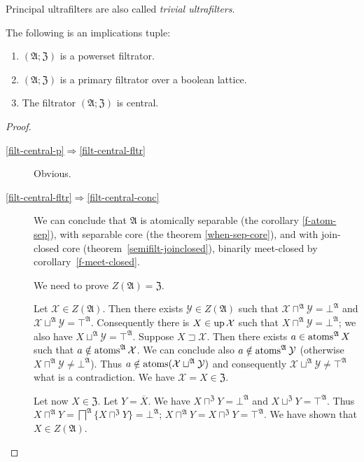 \begin{defn}
Principal ultrafilters are also called
\emph{trivial ultrafilters}.\end{defn}
\begin{thm}
\label{pow-filt-central}The following is an implications tuple:
\begin{enumerate}
\item \label{filt-central-p}$(\mathfrak{A};\mathfrak{Z})$ is a powerset
filtrator.
\item \label{filt-central-fltr}$(\mathfrak{A};\mathfrak{Z})$ is a primary
filtrator over a boolean lattice.
\item \label{filt-central-conc}The filtrator $(\mathfrak{A};\mathfrak{Z})$
is central.
\end{enumerate}
\end{thm}
\begin{proof}
~
\begin{description}
\item [{\ref{filt-central-p}$\Rightarrow$\ref{filt-central-fltr}}] Obvious.
\item [{\ref{filt-central-fltr}$\Rightarrow$\ref{filt-central-conc}}] We
can conclude that $\mathfrak{A}$ is atomically separable (the corollary
\ref{f-atom-sep}), with separable core (the theorem \ref{when-sep-core}),
and with join-closed core (theorem~\ref{semifilt-joinclosed}),
binarily meet-closed by corollary~\ref{f-meet-closed}.


We need to prove $Z(\mathfrak{A})=\mathfrak{Z}$.


Let $\mathcal{X}\in Z(\mathfrak{A})$. Then there exists $\mathcal{Y}\in Z(\mathfrak{A})$
such that $\mathcal{X}\sqcap^{\mathfrak{A}}\mathcal{Y}=\bot^{\mathfrak{A}}$
and $\mathcal{X}\sqcup^{\mathfrak{A}}\mathcal{Y}=\top^{\mathfrak{A}}$.
Consequently there is $X\in\operatorname{up}\mathcal{X}$ such that $X\sqcap^{\mathfrak{A}}\mathcal{Y}=\bot^{\mathfrak{A}}$;
we also have $X\sqcup^{\mathfrak{A}}\mathcal{Y}=\top^{\mathfrak{A}}$.
Suppose $X\sqsupset\mathcal{X}$. Then there exists $a\in\operatorname{atoms}^{\mathfrak{A}}X$
such that $a\notin\operatorname{atoms}^{\mathfrak{A}}\mathcal{X}$. We can conclude
also $a\notin\operatorname{atoms}^{\mathfrak{A}}\mathcal{Y}$ (otherwise $X\sqcap^{\mathfrak{A}}\mathcal{Y}\ne\bot^{\mathfrak{A}}$).
Thus $a\notin\operatorname{atoms}(\mathcal{X}\sqcup^{\mathfrak{A}}\mathcal{Y})$
and consequently $\mathcal{X}\sqcup^{\mathfrak{A}}\mathcal{Y}\ne\top^{\mathfrak{A}}$
what is a contradiction. We have $\mathcal{X}=X\in\mathfrak{Z}$.


Let now $X\in\mathfrak{Z}$. Let $Y=\overline{X}$. We have $X\sqcap^{\mathfrak{Z}}Y=\bot^{\mathfrak{A}}$
and $X\sqcup^{\mathfrak{Z}}Y=\top^{\mathfrak{A}}$. Thus $X\sqcap^{\mathfrak{A}}Y=\bigsqcap^{\mathfrak{A}}\{X\sqcap^{\mathfrak{Z}}Y\}=\bot^{\mathfrak{A}}$;
$X\sqcap^{\mathfrak{A}}Y=X\sqcap^{\mathfrak{Z}}Y=\top^{\mathfrak{A}}$.
We have shown that $X\in Z(\mathfrak{A})$.

\end{description}
\end{proof}

